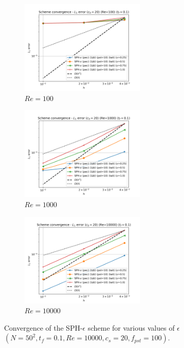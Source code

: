 \begin{figure}[htbp!]
  \begin{subfigure}{7cm}
    \centering\includegraphics[width=6cm]{Code-Figures/mon2017/meps/dt_pois_conv_c0_20_re_100.png}
    \caption{$Re = 100$}
  \end{subfigure}
  \begin{subfigure}{7cm}
    \centering\includegraphics[width=6cm]{Code-Figures/mon2017/meps/dt_pois_conv_c0_20_re_1000.png}
    \caption{$Re = 1000$}
  \end{subfigure}
  \begin{subfigure}{7cm}
    \centering\includegraphics[width=6cm]{Code-Figures/mon2017/meps/dt_pois_conv_c0_20_re_10000.png}
    \caption{$Re = 10000$}
  \end{subfigure}
  \caption{Convergence of the SPH-$\epsilon$ scheme for various values of $\epsilon$  $(N=50^2, t_f=0.1, Re=10000, c_s=20, f_{pst}=100)$.}
  \label{fig:sph-eps-meps}
\end{figure}

